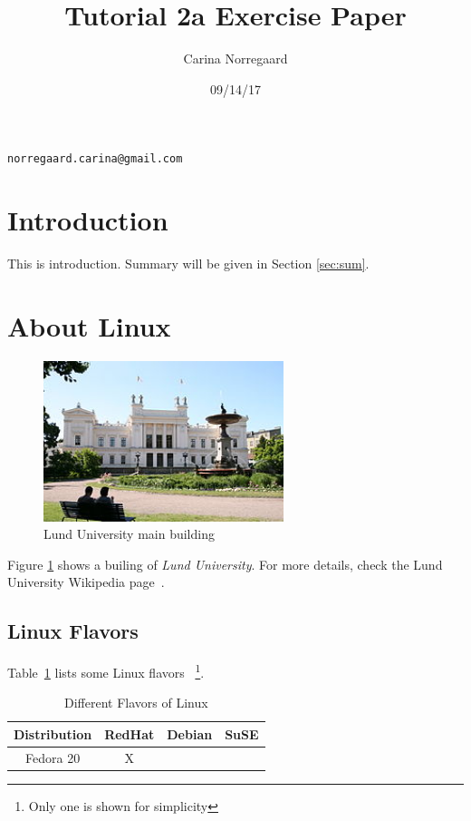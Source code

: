 \documentclass[a4paper,12pt,twoside]{article}
\author{Carina Norregaard}
\title{Tutorial 2a Exercise Paper}
\date{09/14/17}
\begin{document}
 
 \maketitle
 
 \begin{center}
  \texttt{norregaard.carina@gmail.com}
 \end{center}
 
 \section{Introduction}
 \label{sec:intro}
 
 This is introduction. Summary will be given in Section \ref{sec:sum}.
 
 \section{About Linux}
 \label{sec:linux}
 
 \begin{figure}[h]
    \begin{center}
     \includegraphics[width=7cm]{lunduni.jpg}
     \caption{Lund University main building}
     \label{fig:lund}
    \end{center}
 \end{figure}

 Figure \ref{fig:lund} shows a builing of \textit{Lund University}. For more details, check the Lund University Wikipedia page~\cite{lundwiki}.
 
\subsection{Linux Flavors}
\label{sec:flavors}

Table~\ref{tab:flavors} lists some Linux flavors ~\footnote{Only one is shown for simplicity}.

\begin{table}[h]
\begin{center}
 \caption{Different Flavors of Linux}
 \label{tab:flavors}
 \begin{tabular}{c|c|c|c}
  \textbf{Distribution}&RedHat&Debian&SuSE\\ \hline \hline
  Fedora 20 & X & & \\ \hline
 \end{tabular}

\end{center}
\end{table}
\end{document}
